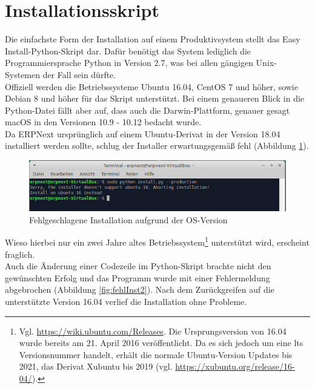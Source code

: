 \section{Installationsskript}
Die einfachste Form der Installation auf einem Produktivsystem stellt das \glqq Easy Install\grqq-Python-Skript dar. Dafür benötigt das System lediglich die Programmiersprache Python in Version 2.7, was bei allen gängigen Unix-Systemen der Fall sein dürfte. \\
Offiziell werden die Betriebssysteme Ubuntu 16.04, CentOS 7 und höher, sowie Debian 8 und höher für das Skript unterstützt. Bei einem genaueren Blick in die Python-Datei fällt aber auf, dass auch die Darwin-Plattform, genauer gesagt macOS in den Versionen 10.9 - 10.12 bedacht wurde.\\
Da ERPNext ursprünglich auf einem Ubuntu-Derivat in der Version 18.04 installiert werden sollte, schlug der Installer erwartungsgemäß fehl (\vgl Abbildung \ref{fig:fehlInst}).
\begin{figure}[H]
  \centering
  \includegraphics[width=\textwidth]{Bilder/Fehlgeschlagene_Installation.PNG}
  \caption{Fehlgeschlagene Installation aufgrund der OS-Version}
  \label{fig:fehlInst}
\end{figure}
Wieso hierbei nur ein zwei Jahre altes Betriebssystem\footnote{Vgl. \url{https://wiki.ubuntu.com/Releases}. Die Ursprungsversion von 16.04 wurde bereits am 21. April 2016 veröffentlicht. Da es sich jedoch um eine \gls{lts} Versionsnummer handelt, erhält die normale Ubuntu-Version Updates bis 2021, das Derivat Xubuntu bis 2019 (vgl. \url{https://xubuntu.org/release/16-04/}).}  unterstützt wird, erscheint fraglich.\\
Auch die Änderung einer Codezeile im Python-Skript brachte nicht den gewünschten Erfolg und das Programm wurde mit einer Fehlermeldung abgebrochen (\vgl Abbildung \ref{fig:fehlInst2}). Nach dem Zurückgreifen auf die unterstützte Version 16.04 verlief die Installation ohne Probleme.
